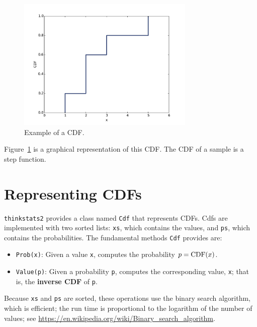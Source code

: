 \documentclass[12pt]{book}
\begin{document}
\begin{figure}
\centerline{\includegraphics[height=2.5in]{figs/cumulative_example_cdf.pdf}}
\caption{Example of a CDF.}
\label{example_cdf}
\end{figure}

Figure~\ref{example_cdf} is a graphical representation of this CDF.
The CDF of a sample is a step function.


\section{Representing CDFs}

{\tt thinkstats2} provides a class named
{\tt Cdf} that represents CDFs.
Cdfs are implemented with two sorted lists: {\tt xs}, which contains
the values, and {\tt ps}, which contains the probabilities.  The
fundamental methods {\tt Cdf} provides are:

\begin{itemize}

\item {\tt Prob(x)}: Given a value {\tt x}, computes the probability
  $p = \mathrm{CDF}(x)$.

\item {\tt Value(p)}: Given a probability {\tt p}, computes the
corresponding value, {\tt x}; that is, the {\bf inverse CDF} of {\tt p}.

\end{itemize}

Because {\tt xs} and {\tt ps} are sorted, these operations use the
binary search algorithm, which is efficient; the run time is proportional
to the logarithm of the number of values; see
\url{https://en.wikipedia.org/wiki/Binary_search_algorithm}.
\end{document}
